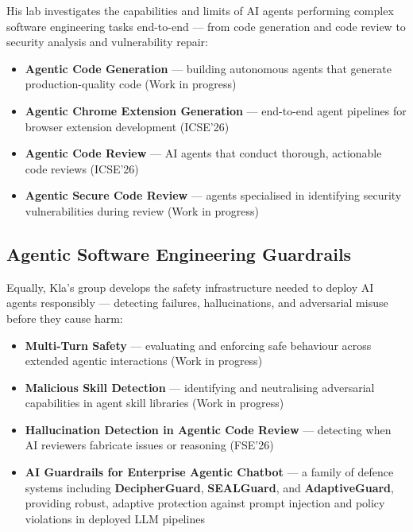 \documentclass[11pt,a4paper]{book}
\begin{document}
His lab investigates the capabilities and limits of AI agents performing complex software engineering tasks end-to-end --- from code generation and code review to security analysis and vulnerability repair:

\begin{itemize}
  \item \textbf{Agentic Code Generation} --- building autonomous agents that generate production-quality code (Work in progress)
  \item \textbf{Agentic Chrome Extension Generation} --- end-to-end agent pipelines for browser extension development (ICSE'26)
  \item \textbf{Agentic Code Review} --- AI agents that conduct thorough, actionable code reviews (ICSE'26)
  \item \textbf{Agentic Secure Code Review} --- agents specialised in identifying security vulnerabilities during review (Work in progress)
\end{itemize}



\subsection{Agentic Software Engineering Guardrails}

Equally, Kla's group develops the safety infrastructure needed to deploy AI agents responsibly --- detecting failures, hallucinations, and adversarial misuse before they cause harm:

\begin{itemize}
  \item \textbf{Multi-Turn Safety} --- evaluating and enforcing safe behaviour across extended agentic interactions (Work in progress)
  \item \textbf{Malicious Skill Detection} --- identifying and neutralising adversarial capabilities in agent skill libraries (Work in progress)
  \item \textbf{Hallucination Detection in Agentic Code Review} --- detecting when AI reviewers fabricate issues or reasoning (FSE'26)
\end{itemize}

\begin{itemize}
  \item \textbf{AI Guardrails for Enterprise Agentic Chatbot} --- a family of defence systems including \textbf{DecipherGuard}, \textbf{SEALGuard}, and \textbf{AdaptiveGuard}, providing robust, adaptive protection against prompt injection and policy violations in deployed LLM pipelines
\end{itemize}
\end{document}
